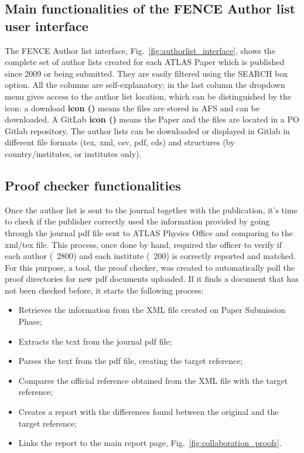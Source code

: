 \subsection{Main functionalities of the FENCE Author list user interface}
\label{sec:Main_functionalities_of_the_FENCE_Author_list_user_interface}

The FENCE Author list interface, Fig.~\ref{fig:authorlist_interface}, shows the complete set of author lists created for each ATLAS Paper which is published since 2009 or being submitted. They are easily filtered using the SEARCH box option. All the columns are self-explanatory; in the last column the dropdown menu gives access to the author list location, which can be distinguished by the icon: a download\textbf{ icon ()} means the files are stored in AFS and can be downloaded. A GitLab \textbf{icon ()} means the Paper and the files are located in a PO Gitlab repository. The author lists can be downloaded or displayed in Gitlab in different file formats (tex, xml, csv, pdf, cds) and structures (by country/institutes, or institutes only). 

\subsection{Proof checker functionalities}
\label{sec:Proof_checker_functionalities}
Once the author list is sent to the journal together with the publication, it’s time to check if the publisher correctly used the information provided by going through the journal pdf file sent to ATLAS Physics Office and comparing to the xml/tex file. This process, once done by hand, required the officer to verify if each author (~2800) and each institute (~200) is correctly reported and matched. 
For this purpose, a tool, the proof checker, was created to automatically poll the proof directories for new pdf documents uploaded. If it finds a document that has not been checked before, it starts the following process:

\begin{itemize}
\item Retrieves the information from the XML file created on Paper Submission Phase;
\item Extracts the text from the journal pdf file;
\item Parses the text from the pdf file, creating the target reference;
\item Compares the official reference obtained from the XML file with the target reference;
\item Creates a report with the differences found between the original and the target reference;
\item Links the report to the main report page, Fig.~\ref{fig:collaboration_proofs}.
\end{itemize}

